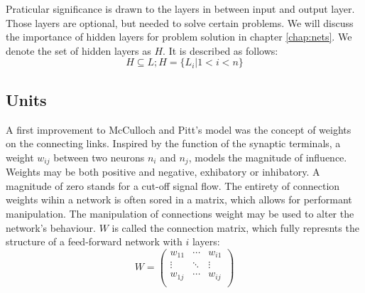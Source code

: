 \documentclass[10pt,a4paper,DIV=11]{scrreprt}
\begin{document}
\begin{figure}
\label{fig:layer}
\end{figure}

Praticular significance is drawn to the layers in between input and output layer. Those layers are optional, but needed to solve certain problems. We will discuss the importance of hidden layers for problem solution in chapter \ref{chap:nets}. We denote the set of hidden layers as $H$. It is described as follows:
\begin{equation}
H \subseteq L; H = \{L_i|1<i<n\}
\end{equation}

\subsection{Units}
\label{subsec:weights}

A first improvement to McCulloch and Pitt's model was the concept of weights on the connecting links. Inspired by the function of the synaptic terminals, a weight $w_{ij}$ between two neurons $n_i$ and $n_j$, models the magnitude of influence. Weights may be both positive and negative, exhibatory or inhibatory. A magnitude of zero stands for a cut-off signal flow. The entirety of connection weights wihin a network is often sored in a matrix, which allows for performant manipulation. The manipulation of connections weight may be used to alter the network's behaviour. $W$ is called the connection matrix, which fully represnts the structure of a feed-forward network with $i$ layers:
\begin{equation}
W = 
\begin{pmatrix}
w_{11} & \cdots & w_{i1} \\
\vdots & \ddots & \vdots \\
w_{1j} & \cdots & w_{ij} \\
\end{pmatrix}
\end{equation}
\end{document}

